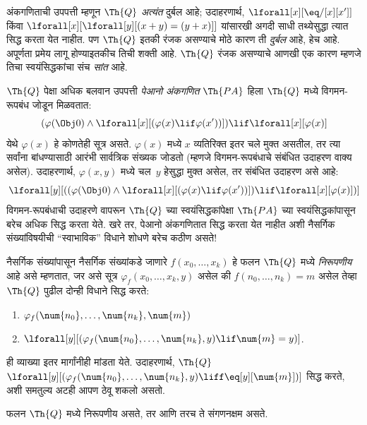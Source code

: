 अंकगणिताची उपपत्ती म्हणून $\Th{Q}$ \emph{अत्यंत} दुर्बल आहे;
उदाहरणार्थ, $\lforall[x][\eq/[x][x']]$ किंवा
$\lforall[x][\lforall[y][(x + y) = (y + x)]]$ यांसारखी
अगदी साधी तथ्येसुद्धा त्यात सिद्ध करता येत नाहीत. पण $\Th{Q}$
इतकी रंजक असण्याचे मोठे कारण ती \emph{दुर्बल} आहे, हेच आहे.
अपूर्णता प्रमेय लागू होण्याइतकीच तिची शक्ती आहे. $\Th{Q}$
रंजक असण्याचे आणखी एक कारण म्हणजे तिचा स्वयंसिद्धकांचा संच
\emph{सांत} आहे.

$\Th{Q}$ पेक्षा अधिक बलवान उपपत्ती \emph{पेआनो अंकगणित}
$\Th{PA}$ हिला $\Th{Q}$ मध्ये विगमन-रूपबंध जोडून मिळवतात:
\[(\varphi(\Obj 0) \land \lforall[x][(\varphi(x) \lif \varphi(x'))]) \lif \lforall[x][\varphi(x)]
\]
येथे $\varphi(x)$ हे कोणतेही सूत्र असते. $\varphi(x)$ मध्ये $x$ व्यतिरिक्त
इतर चले मुक्त असतील, तर त्या सर्वांना बांधण्यासाठी
आरंभी सार्वत्रिक संख्यक जोडतो (म्हणजे विगमन-रूपबंधाचे संबंधित
उदाहरण वाक्य असेल). उदाहरणार्थ, $\varphi(x, y)$ मध्ये
चल~$y$ हेसुद्धा मुक्त असेल, तर संबंधित उदाहरण असे आहे:
\[\lforall[y][((\varphi(\Obj 0) \land \lforall[x][(\varphi(x) \lif \varphi(x'))]) \lif
  \lforall[x][\varphi(x)])]
\]
विगमन-रूपबंधाची उदाहरणे वापरून $\Th{Q}$ च्या स्वयंसिद्धकांपेक्षा
$\Th{PA}$ च्या स्वयंसिद्धकांपासून बरेच अधिक सिद्ध करता येते.
खरे तर, पेआनो अंकगणितात सिद्ध करता येत नाहीत अशी नैसर्गिक
संख्यांविषयीची ``स्वाभाविक'' विधाने शोधणे बरेच कठीण असते!{}

\begin{defn}
\label{inc:req:int:defn:representable-fn}
  नैसर्गिक संख्यांपासून नैसर्गिक संख्यांकडे जाणारे
  $f(x_0,\ldots,x_k)$ हे फलन $\Th{Q}$ मध्ये
  {\em निरूपणीय} आहे असे म्हणतात, जर असे सूत्र
  $\varphi_f(x_0,\dots,x_k,y)$ असेल की
  $f(n_0,\dots,n_k) = m$ असेल तेव्हा $\Th{Q}$ पुढील दोन्ही
  विधाने सिद्ध करते:
\begin{enumerate}
\item\label{inc:req:int:defn:rep:a} $\varphi_f(\num{n_0}, \dots, \num{n_k}, \num{m})$
\item\label{inc:req:int:defn:rep:b} $\lforall[y][(\varphi_f(\num{n_0}, \dots,
\num{n_k}, y) \lif \num{m} = y)]$.
\end{enumerate}
\end{defn}

ही व्याख्या इतर मार्गांनीही मांडता येते. उदाहरणार्थ, $\Th{Q}$
$\lforall[y][(\varphi_f(\num{n_0}, \dots,
\num{n_k}, y) \liff \eq[y][\num{m}])]$ सिद्ध करते, अशी
समतुल्य अटही आपण ठेवू शकलो असतो.

\begin{thm}
\label{inc:req:int:thm:representable-iff-comp}
फलन $\Th{Q}$ मध्ये निरूपणीय असते, तर आणि तरच ते संगणनक्षम असते.
\end{thm}

